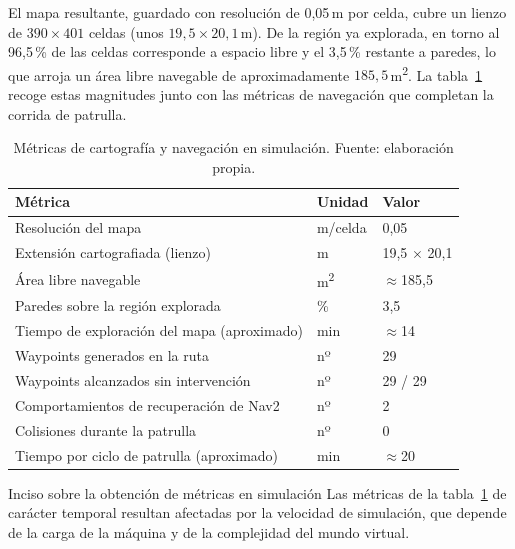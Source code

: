 El mapa resultante, guardado con resolución de 0,05\,m por celda, cubre un lienzo de
$390\times401$ celdas (unos $19{,}5\times20{,}1$\,m). De la región ya explorada, en torno al
96{,}5\,\% de las celdas corresponde a espacio libre y el 3{,}5\,\% restante a paredes, lo
que arroja un área libre navegable de aproximadamente $185{,}5$\,m\textsuperscript{2}. La
tabla~\ref{tab:metricas-navegacion} recoge estas magnitudes junto con las métricas de
navegación que completan la corrida de patrulla.

\begin{table}[htbp]
  \centering
  \small
  \caption{Métricas de cartografía y navegación en simulación. Fuente: elaboración propia.}
  \label{tab:metricas-navegacion}
  \begin{tabular}{@{}>{\raggedright\arraybackslash}p{7.5cm} l l@{}}
    \toprule
    \textbf{Métrica} & \textbf{Unidad} & \textbf{Valor} \\
    \midrule
    Resolución del mapa                                   & m/celda & 0,05 \\
    Extensión cartografiada (lienzo)                      & m       & 19,5 $\times$ 20,1 \\
    Área libre navegable                                  & m\textsuperscript{2} & $\approx$185,5 \\
    Paredes sobre la región explorada                     & \%      & 3,5 \\
    Tiempo de exploración del mapa (aproximado)           & min       & $\approx$14 \\
    Waypoints generados en la ruta                        & nº      & 29  \\
    Waypoints alcanzados sin intervención                 & nº      & 29 / 29 \\
    Comportamientos de recuperación de Nav2               & nº      & 2   \\
    Colisiones durante la patrulla                        & nº      & 0   \\
    Tiempo por ciclo de patrulla (aproximado)             & min       & $\approx$20\\
    \bottomrule
  \end{tabular}
\end{table}

\begin{notebox}{Inciso sobre la obtención de métricas en simulación}
  Las métricas de la tabla~\ref{tab:metricas-navegacion} de carácter temporal resultan afectadas por 
la velocidad de simulación, que depende de la carga de la máquina y de la complejidad del
mundo virtual.
\end{notebox}

